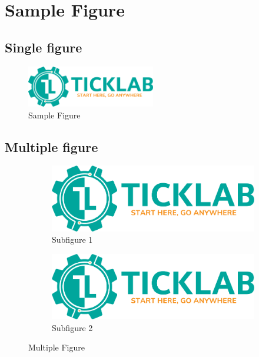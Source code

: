 \chapter{Sample Figure}
    \section{Single figure}
        \begin{figure}[h]
            \centering
            \includegraphics[width=0.5\textwidth]{figures/logo/START_HERE__GO_ANYWHERE-removebg-preview.png}
            \caption{Sample Figure}
            \label{fig:sample_single_figure}
        \end{figure}

    \section{Multiple figure}
        \begin{figure}[h]
            \centering
            \begin{subfigure}[b]{0.4\textwidth}
                \includegraphics[width=\textwidth]{figures/logo/START_HERE__GO_ANYWHERE-removebg-preview.png}
                \caption{Subfigure 1}
                \label{fig:subfigure1}
            \end{subfigure}
            \begin{subfigure}[b]{0.4\textwidth}
                \includegraphics[width=\textwidth]{figures/logo/START_HERE__GO_ANYWHERE-removebg-preview.png}
                \caption{Subfigure 2}
                \label{fig:subfigure2}
            \end{subfigure}
            \caption{Multiple Figure}
            \label{fig:multiple_figure}
        \end{figure}